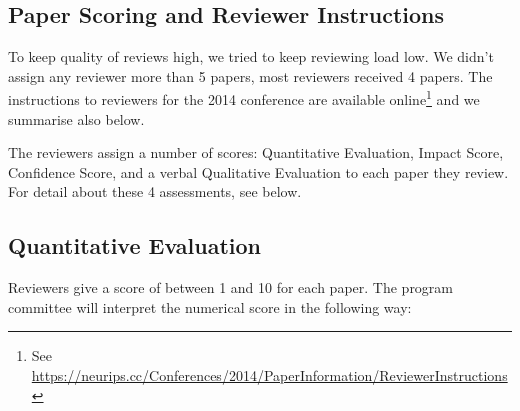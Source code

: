 \subsection{Paper Scoring and Reviewer
Instructions}\label{paper-scoring-and-reviewer-instructions}

To keep quality of reviews high, we tried to keep reviewing load low. We didn't
assign any reviewer more than 5 papers, most reviewers received 4
papers.
The instructions to reviewers for the 2014 conference are 
available online\footnote{See  
\url{https://neurips.cc/Conferences/2014/PaperInformation/ReviewerInstructions}} and we summarise also below.

The reviewers assign a number of scores: Quantitative Evaluation,
Impact Score, Confidence Score, and a verbal Qualitative Evaluation to
each paper they review. For detail about these 4 assessments, see below.

\subsection*{Quantitative Evaluation}
Reviewers give a score of between 1 and 10 for each paper. The program
committee will interpret the numerical score in the following way:

